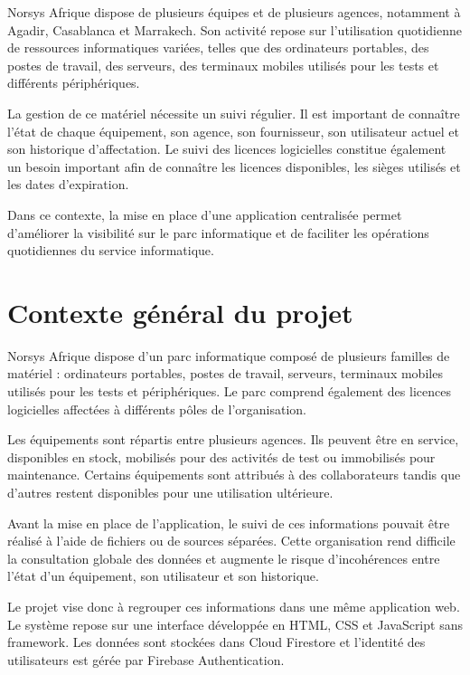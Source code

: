 \documentclass{rapportENSIAS}
\begin{document}
Norsys Afrique dispose de plusieurs équipes et de plusieurs agences, notamment à Agadir, Casablanca et Marrakech. Son activité repose sur l’utilisation quotidienne de ressources informatiques variées, telles que des ordinateurs portables, des postes de travail, des serveurs, des terminaux mobiles utilisés pour les tests et différents périphériques.

La gestion de ce matériel nécessite un suivi régulier. Il est important de connaître l’état de chaque équipement, son agence, son fournisseur, son utilisateur actuel et son historique d’affectation. Le suivi des licences logicielles constitue également un besoin important afin de connaître les licences disponibles, les sièges utilisés et les dates d’expiration.

Dans ce contexte, la mise en place d’une application centralisée permet d’améliorer la visibilité sur le parc informatique et de faciliter les opérations quotidiennes du service informatique.

\section{Contexte général du projet}

Norsys Afrique dispose d’un parc informatique composé de plusieurs familles de matériel : ordinateurs portables, postes de travail, serveurs, terminaux mobiles utilisés pour les tests et périphériques. Le parc comprend également des licences logicielles affectées à différents pôles de l’organisation.

Les équipements sont répartis entre plusieurs agences. Ils peuvent être en service, disponibles en stock, mobilisés pour des activités de test ou immobilisés pour maintenance. Certains équipements sont attribués à des collaborateurs tandis que d’autres restent disponibles pour une utilisation ultérieure.

Avant la mise en place de l’application, le suivi de ces informations pouvait être réalisé à l’aide de fichiers ou de sources séparées. Cette organisation rend difficile la consultation globale des données et augmente le risque d’incohérences entre l’état d’un équipement, son utilisateur et son historique.

Le projet vise donc à regrouper ces informations dans une même application web. Le système repose sur une interface développée en HTML, CSS et JavaScript sans framework. Les données sont stockées dans Cloud Firestore et l’identité des utilisateurs est gérée par Firebase Authentication.
\end{document}
